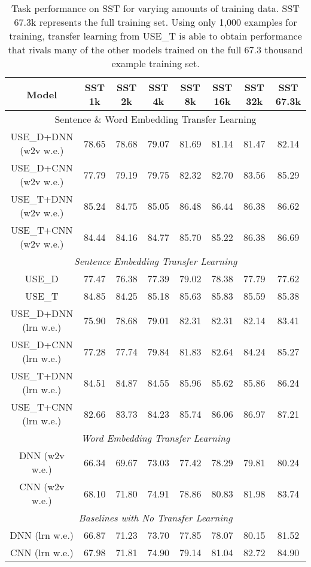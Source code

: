 \documentclass[11pt,a4paper]{article}
\begin{document}
\begin{table*}
\begin{tabular}{|c|c|c|c|c|c|c|c|}
\hline
Model & SST 1k & SST 2k & SST 4k & SST 8k & SST 16k & SST 32k & SST 67.3k \\
\hline
\multicolumn{8}{|c|}{Sentence \& Word Embedding Transfer Learning} \\
\hline
USE\_D+DNN (w2v w.e.)  & 78.65  & 78.68  & 79.07  & 81.69  & 81.14  & 81.47 & 82.14 \\
USE\_D+CNN (w2v w.e.)  & 77.79  & 79.19  & 79.75  & 82.32  & 82.70  & 83.56 & 85.29 \\
USE\_T+DNN (w2v w.e.)  & 85.24  & 84.75  & 85.05  & 86.48  & 86.44  & 86.38 & 86.62 \\
USE\_T+CNN (w2v w.e.)  & 84.44  & 84.16  & 84.77  & 85.70  & 85.22  & 86.38 & 86.69 \\
\hline
\multicolumn{8}{|c|}{\emph{Sentence Embedding Transfer Learning}} \\
\hline
USE\_D  & 77.47  & 76.38  & 77.39  & 79.02  & 78.38  & 77.79 & 77.62 \\
USE\_T  & 84.85  & 84.25  & 85.18  & 85.63  & 85.83  & 85.59 & 85.38 \\
USE\_D+DNN (lrn w.e.)  & 75.90  & 78.68  & 79.01  & 82.31  & 82.31  & 82.14 & 83.41 \\
USE\_D+CNN (lrn w.e.)  & 77.28  & 77.74  & 79.84  & 81.83  & 82.64  & 84.24 & 85.27 \\
USE\_T+DNN (lrn w.e.)  & 84.51  & 84.87  & 84.55  & 85.96  & 85.62  & 85.86 & 86.24 \\
USE\_T+CNN (lrn w.e.)  & 82.66  & 83.73  & 84.23  & 85.74  & 86.06  & 86.97 & 87.21 \\
\hline
\multicolumn{8}{|c|}{\emph{Word Embedding Transfer Learning}} \\
\hline
DNN (w2v w.e.)  & 66.34  & 69.67  & 73.03  & 77.42  & 78.29  & 79.81 & 80.24 \\
CNN (w2v w.e.)  & 68.10  & 71.80  & 74.91  & 78.86  & 80.83  & 81.98 & 83.74 \\
\hline
\multicolumn{8}{|c|}{\emph{Baselines with No Transfer Learning}} \\
\hline
DNN (lrn w.e.)  & 66.87  & 71.23  & 73.70  & 77.85  & 78.07  & 80.15 & 81.52 \\
CNN (lrn w.e.)  & 67.98  & 71.81  & 74.90  & 79.14  & 81.04  & 82.72 & 84.90 \\
\hline
\end{tabular}
\caption{Task performance on SST for varying amounts of training data. SST 67.3k represents the full training set. Using only 1,000 examples for training, transfer learning from USE\_T is able to obtain performance that rivals many of the other models trained on the full 67.3 thousand example training set. }
\label{table:transfer_perf_vs_train_set_sz}
\end{table*}
\end{document}
